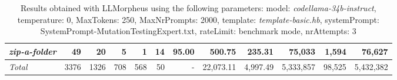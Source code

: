 \begin{table*}
{\begin{tabular}{l||r|r|r|r|r|r||r|r||r|r|r}
   \hline
   \textit{zip-a-folder} & 49 & 20 & 5 & 1 & 14 & 95.00 & 500.75 & 235.31 & 75,033 & 1,594 & 76,627 \\ 
   \hline
   \textit{Total} & 3376 & 1326 & 708 & 568 & 50 & - & 22,073.11  & 4,997.49 & 5,333,857 & 98,525 & 5,432,382 \\ 
 \end{tabular}
 }
 \caption{Results obtained with LLMorpheus using the following parameters: 
   model: \textit{codellama-34b-instruct}, 
   temperature: 0, 
   MaxTokens: 250, 
   MaxNrPrompts: 2000, 
   template: \textit{template-basic.hb}, 
   systemPrompt: SystemPrompt-MutationTestingExpert.txt, 
   rateLimit: benchmark mode, 
   nrAttempts: 3  
 }
\end{table*}

